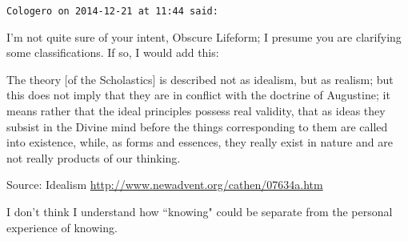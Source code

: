 \begin{footnotesize}
\begin{sffamily}
\hfill

\texttt{Cologero on 2014-12-21 at 11:44 said: }

I'm not quite sure of your intent, Obscure Lifeform; I presume you are clarifying some classifications. If so, I would add this:

\begin{quotex}
The theory [of the Scholastics] is described not as idealism, but as realism; but this does not imply that they are in conflict with the doctrine of Augustine; it means rather that the ideal principles possess real validity, that as ideas they subsist in the Divine mind before the things corresponding to them are called into existence, while, as forms and essences, they really exist in nature and are not really products of our thinking.

Source: Idealism \url{http://www.newadvent.org/cathen/07634a.htm}

\end{quotex}
I don't think I understand how ``knowing" could be separate from the personal experience of knowing.


\end{sffamily}\end{footnotesize}
